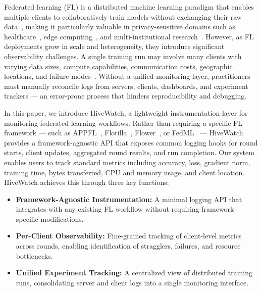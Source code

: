 Federated learning (FL) is a distributed machine learning paradigm that enables multiple clients to collaboratively train models without exchanging their raw data~\cite{mcmahan2017communication}, making it particularly valuable in privacy-sensitive domains such as healthcare~\cite{rieke2020future}, edge computing~\cite{lim2020federated}, and multi-institutional research~\cite{kairouz2021advances}. However, as FL deployments grow in scale and heterogeneity, they introduce significant observability challenges. A single training run may involve many clients with varying data sizes, compute capabilities, communication costs, geographic locations, and failure modes~\cite{kairouz2021advances, li2020federated}. Without a unified monitoring layer, practitioners must manually reconcile logs from servers, clients, dashboards, and experiment trackers — an error-prone process that hinders reproducibility and debugging.

In this paper, we introduce HiveWatch, a lightweight instrumentation layer for monitoring federated learning workflows. Rather than requiring a specific FL framework — such as APPFL~\cite{ryu2022appfl, li2025advances}, Flotilla~\cite{banerjee2025flotilla}, Flower~\cite{beutel2020flower}, or FedML~\cite{he2020fedml} — HiveWatch provides a framework-agnostic API that exposes common logging hooks for round starts, client updates, aggregated round results, and run completion. Our system enables users to track standard metrics including accuracy, loss, gradient norm, training time, bytes transferred, CPU and memory usage, and client location. HiveWatch achieves this through three key functions:
\begin{itemize}
    \item \textbf{Framework-Agnostic Instrumentation:} A minimal logging API that integrates with any existing FL workflow without requiring framework-specific modifications.
    \item \textbf{Per-Client Observability:} Fine-grained tracking of client-level metrics across rounds, enabling identification of stragglers, failures, and resource bottlenecks.
    \item \textbf{Unified Experiment Tracking:} A centralized view of distributed training runs, consolidating server and client logs into a single monitoring interface.
\end{itemize}

